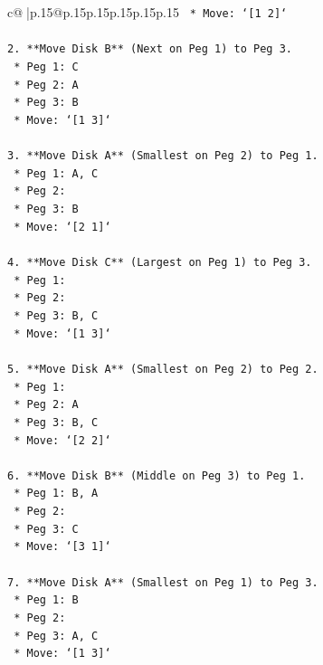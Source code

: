 \documentclass{article}
\begin{document}
{\begin{supertabular}{c@{$\;$}|p{.15\linewidth}@{}p{.15\linewidth}p{.15\linewidth}p{.15\linewidth}p{.15\linewidth}p{.15\linewidth}}
{{{\texttt{    *   Move: `{[}1 2{]}`} \\
\\ 
\texttt{2.  **Move Disk B** (Next on Peg 1) to Peg 3.} \\
\texttt{    *   Peg 1: C} \\
\texttt{    *   Peg 2: A} \\
\texttt{    *   Peg 3: B} \\
\texttt{    *   Move: `{[}1 3{]}`} \\
\\ 
\texttt{3.  **Move Disk A** (Smallest on Peg 2) to Peg 1.} \\
\texttt{    *   Peg 1: A, C} \\
\texttt{    *   Peg 2:} \\
\texttt{    *   Peg 3: B} \\
\texttt{    *   Move: `{[}2 1{]}`} \\
\\ 
\texttt{4.  **Move Disk C** (Largest on Peg 1) to Peg 3.} \\
\texttt{    *   Peg 1:} \\
\texttt{    *   Peg 2:} \\
\texttt{    *   Peg 3: B, C} \\
\texttt{    *   Move: `{[}1 3{]}`} \\
\\ 
\texttt{5.  **Move Disk A** (Smallest on Peg 2) to Peg 2.} \\
\texttt{    *   Peg 1:} \\
\texttt{    *   Peg 2: A} \\
\texttt{    *   Peg 3: B, C} \\
\texttt{    *   Move: `{[}2 2{]}`} \\
\\ 
\texttt{6.  **Move Disk B** (Middle on Peg 3) to Peg 1.} \\
\texttt{    *   Peg 1: B, A} \\
\texttt{    *   Peg 2:} \\
\texttt{    *   Peg 3: C} \\
\texttt{    *   Move: `{[}3 1{]}`} \\
\\ 
\texttt{7.  **Move Disk A** (Smallest on Peg 1) to Peg 3.} \\
\texttt{    *   Peg 1: B} \\
\texttt{    *   Peg 2:} \\
\texttt{    *   Peg 3: A, C} \\
\texttt{    *   Move: `{[}1 3{]}`} \\
}}}
\end{supertabular}}
\end{document}
